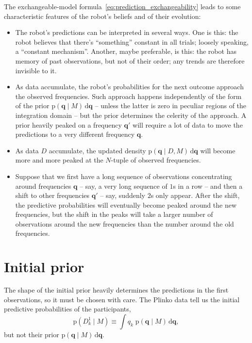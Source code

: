 \documentclass[\ifafour a4paper,12pt,\else a5paper,10pt,\fi%
onecolumn,oneside,article,%
british%
]{memoir}
\theoremstyle{remark}
\theoremstyle{innote}
\newcommand*{\di}{\mathrm{d}}%
\newcommand*{\pf}{\mathrm{p}}%
\renewcommand*{\|}{\mathpunct{|}}
\newcommand*{\yqq}{q}
\newcommand*{\yq}{\bm{\yqq}}
\begin{document}
The exchangeable-model formula~\eqref{eq:prediction_exchangeability} leads
to some characteristic features of the robot's beliefs and of their
evolution:
\begin{itemize}
\item The robot's predictions can be interpreted in several ways. One is
  this: the robot believes that there's \enquote{something} constant in all
  trials; loosely speaking, a \enquote{constant mechanism}. Another, maybe
  preferable, is this: the robot has memory of past observations, but not
  of their order; any trends are therefore invisible to it.
\item As data accumulate, the robot's probabilities for the next outcome
  approach the observed frequencies. Such approach happens independently of
  the form of the prior $\pf(\yq \| M)\,\di\yq$ -- unless the latter is
  zero in peculiar regions of the integration domain -- but the prior
  determines the celerity of the approach. A prior heavily peaked on a
  frequency $\yq'$ will require a lot of data to move the predictions to
  a very different frequency $\yq$.
\item As data $D$ accumulate, the updated density
  $\pf(\yq \| D, M)\,\di\yq$ will become more and more peaked at the
  $N$-tuple of observed frequencies.
\item Suppose that we first have a long sequence of observations
  concentrating around frequencies $\yq$ -- say, a very long sequence of
  $1$s in a row -- and then a shift to other frequencies $\yq'$ -- say,
  suddenly $2$s only appear. After the shift, the predictive probabilities
  will eventually become peaked around the new frequencies, but the shift
  in the peaks will take a larger number of observations around the new
  frequencies than the number around the old frequencies.
\end{itemize}


\section{Initial prior}
\label{sec:initial_prior}

The shape of the initial prior heavily determines the predictions in the
first observations, so it must be chosen with care. The Plinko data tell us
the initial predictive probabilities of the participants,
\begin{equation}
  \label{eq:initial_predictive}
  \pf(D^1_{k} \| M) \equiv \int \yqq_{k}\; \pf(\yq \| M)\,\di\yq,
\end{equation}
but not their prior $\pf(\yq \| M)\,\di\yq$.
\end{document}
